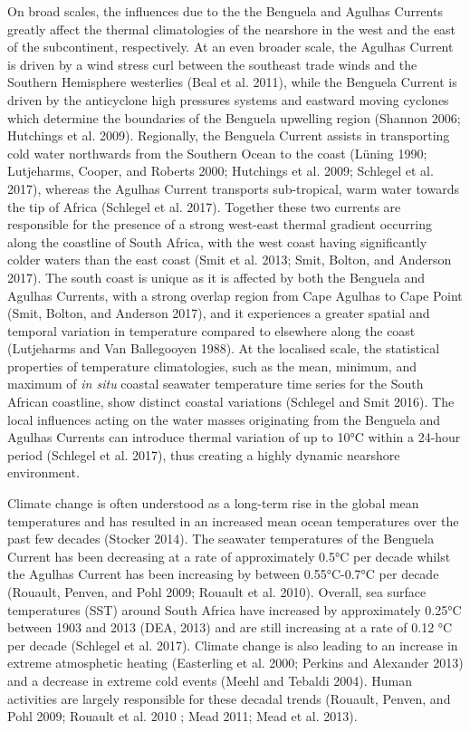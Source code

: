 \documentclass[12pt,a4paper,]{article}
\begin{document}
On broad scales, the influences due to the the Benguela and Agulhas
Currents greatly affect the thermal climatologies of the nearshore in
the west and the east of the subcontinent, respectively. At an even
broader scale, the Agulhas Current is driven by a wind stress curl
between the southeast trade winds and the Southern Hemisphere westerlies
(Beal et al. 2011), while the Benguela Current is driven by the
anticyclone high pressures systems and eastward moving cyclones which
determine the boundaries of the Benguela upwelling region (Shannon 2006;
Hutchings et al. 2009). Regionally, the Benguela Current assists in
transporting cold water northwards from the Southern Ocean to the coast
(Lüning 1990; Lutjeharms, Cooper, and Roberts 2000; Hutchings et al.
2009; Schlegel et al. 2017), whereas the Agulhas Current transports
sub-tropical, warm water towards the tip of Africa (Schlegel et al.
2017). Together these two currents are responsible for the presence of a
strong west-east thermal gradient occurring along the coastline of South
Africa, with the west coast having significantly colder waters than the
east coast (Smit et al. 2013; Smit, Bolton, and Anderson 2017). The
south coast is unique as it is affected by both the Benguela and Agulhas
Currents, with a strong overlap region from Cape Agulhas to Cape Point
(Smit, Bolton, and Anderson 2017), and it experiences a greater spatial
and temporal variation in temperature compared to elsewhere along the
coast (Lutjeharms and Van Ballegooyen 1988). At the localised scale, the
statistical properties of temperature climatologies, such as the mean,
minimum, and maximum of \emph{in situ} coastal seawater temperature time
series for the South African coastline, show distinct coastal variations
(Schlegel and Smit 2016). The local influences acting on the water
masses originating from the Benguela and Agulhas Currents can introduce
thermal variation of up to 10°C within a 24-hour period (Schlegel et al.
2017), thus creating a highly dynamic nearshore environment.

Climate change is often understood as a long-term rise in the global
mean temperatures and has resulted in an increased mean ocean
temperatures over the past few decades (Stocker 2014). The seawater
temperatures of the Benguela Current has been decreasing at a rate of
approximately 0.5°C per decade whilst the Agulhas Current has been
increasing by between 0.55°C-0.7°C per decade (Rouault, Penven, and Pohl
2009; Rouault et al. 2010). Overall, sea surface temperatures (SST)
around South Africa have increased by approximately 0.25°C between 1903
and 2013 (DEA, 2013) and are still increasing at a rate of 0.12 °C per
decade (Schlegel et al. 2017). Climate change is also leading to an
increase in extreme atmosphetic heating (Easterling et al. 2000; Perkins
and Alexander 2013) and a decrease in extreme cold events (Meehl and
Tebaldi 2004). Human activities are largely responsible for these
decadal trends (Rouault, Penven, and Pohl 2009; Rouault et al. 2010 ;
Mead 2011; Mead et al. 2013).
\end{document}
